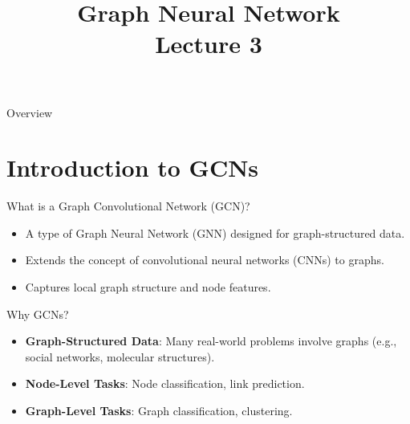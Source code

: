 \documentclass{beamer}
\title[] %
{Graph Neural Network \\Lecture 3
}
\date[] %
\begin{document}
\begin{frame}
    \titlepage
\end{frame}

\begin{frame}{Overview}
    \tableofcontents
\end{frame}

\section{Introduction to GCNs}

\begin{frame}{What is a Graph Convolutional Network (GCN)?}
    \begin{itemize}
        \item A type of Graph Neural Network (GNN) designed for graph-structured data.
        \item Extends the concept of convolutional neural networks (CNNs) to graphs.
        \item Captures local graph structure and node features.
    \end{itemize}
\end{frame}


\begin{frame}{Why GCNs?}
    \begin{itemize}
        \item \textbf{Graph-Structured Data}: Many real-world problems involve graphs (e.g., social networks, molecular structures).
        \item \textbf{Node-Level Tasks}: Node classification, link prediction.
        \item \textbf{Graph-Level Tasks}: Graph classification, clustering.
    \end{itemize}
\end{frame}
\end{document}
